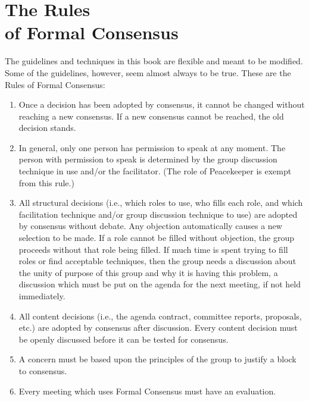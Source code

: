 \section[The Rules]{The Rules\\ of Formal Consensus}

The guidelines and techniques in this book are flexible and meant
to be modified. Some of the guidelines, however, seem almost always
to be true. These are the Rules of Formal Consensus: 

\begin{enumerate}
\item Once a decision has been adopted by consensus, it cannot be
  changed without reaching a new consensus. If a new consensus
  cannot be reached, the old decision stands.

\item In general, only one person has permission to speak at any
  moment. The person with permission to speak is determined by the
  group discussion technique in use and/or the facilitator. (The
  role of Peacekeeper is exempt from this rule.)

\item All structural decisions (i.e., which roles to use, who
  fills each role, and which facilitation technique and/or group
  discussion technique to use) are adopted by consensus without
  debate. Any objection automatically causes a new selection to be
  made. If a role cannot be filled without objection, the group
  proceeds without that role being filled. If much time is spent
  trying to fill roles or find acceptable techniques, then the
  group needs a discussion about the unity of purpose of this
  group and why it is having this problem, a discussion which must
  be put on the agenda for the next meeting, if not held
  immediately.

\item All content decisions (i.e., the agenda contract, committee
  reports, proposals, etc.) are adopted by consensus after
  discussion. Every content decision must be openly discussed
  before it can be tested for consensus.

\item A concern must be based upon the principles of the group to
  justify a block to consensus.

\item Every meeting which uses Formal Consensus must have an
  evaluation.
\end{enumerate}
